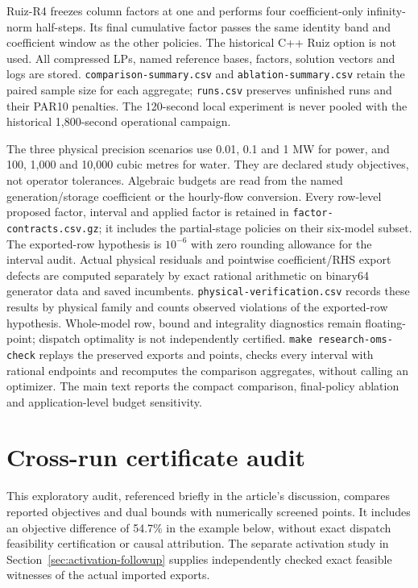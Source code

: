 \documentclass[11pt]{article}
\begin{document}
Ruiz-R4 freezes column factors at one and performs four coefficient-only infinity-norm
half-steps. Its final cumulative factor passes the same identity band and coefficient
window as the other policies. The historical C++ Ruiz option is not used. All
compressed LPs, named reference bases, factors, solution vectors and logs are stored.
\texttt{comparison-summary.csv} and \texttt{ablation-summary.csv} retain the paired
sample size for each aggregate; \texttt{runs.csv} preserves unfinished runs and their
PAR10 penalties. The 120-second local experiment is never pooled with the historical
1,800-second operational campaign.

The three physical precision scenarios use 0.01, 0.1 and 1 MW for power, and 100,
1,000 and 10,000 cubic metres for water. They are declared study objectives, not
operator tolerances. Algebraic budgets are read from the named generation/storage
coefficient or the hourly-flow conversion. Every row-level proposed factor, interval
and applied factor is retained in \texttt{factor-contracts.csv.gz}; it includes the
partial-stage policies on their six-model subset. The exported-row hypothesis is
$10^{-6}$ with zero rounding allowance for the interval audit. Actual physical
residuals and pointwise coefficient/RHS export defects are computed separately by
exact rational arithmetic on binary64 generator data and saved incumbents.
\texttt{physical-verification.csv} records these results by physical family and counts
observed violations of the exported-row hypothesis. Whole-model row, bound and
integrality diagnostics remain floating-point; dispatch optimality is not independently
certified. \texttt{make research-oms-check} replays the preserved exports and points,
checks every interval with rational endpoints and recomputes the comparison aggregates,
without calling an optimizer. The main text reports the compact comparison, final-policy
ablation and application-level budget sensitivity.

\section{Cross-run certificate audit}
\label{sec:stored-run-audit}
This exploratory audit, referenced briefly in the article's discussion, compares
reported objectives and dual bounds with numerically screened points. It includes
an objective difference of 54.7\% in the example below, without exact dispatch
feasibility certification or causal attribution. The separate activation study in
Section~\ref{sec:activation-followup} supplies independently checked exact feasible
witnesses of the actual imported exports.
\end{document}
